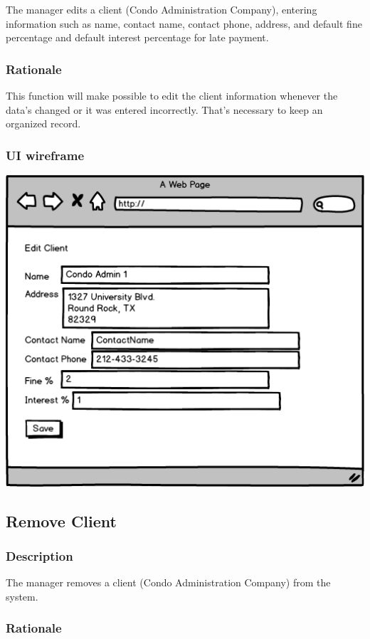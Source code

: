\documentclass{scrreprt}
\begin{document}
The manager edits a client (Condo Administration Company), entering information such as name, contact name, contact phone, address, and default fine percentage and default interest percentage for late payment.

\subsubsection{Rationale}

This function will make possible to edit the client information whenever the data's changed or it was entered incorrectly. That's necessary to keep an organized record.

\subsubsection{UI wireframe}
\includegraphics[scale=0.60]{mockups/editclient.png}

\subsection{Remove Client}
\subsubsection{Description}

The manager removes a client (Condo Administration Company) from the system.

\subsubsection{Rationale}
\end{document}
